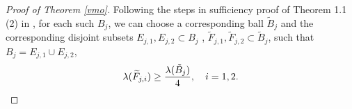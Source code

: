 \documentclass[11pt,a4paper]{amsart}
\numberwithin{equation}{section}
\begin{document}
{\begin{proof}[Proof of   Theorem \ref{vmo}]
Following the steps in sufficiency proof of Theorem 1.1 (2) in \cite{DLLWW}, for each such $B_j$, we can choose a corresponding ball  $\tilde B_j$  and the corresponding disjoint subsets $E_{j,1}, E_{j,2}\subset B_j$ , $\widetilde F_{j,1}, \widetilde F_{j,2}\subset\tilde B_j$, such that $B_j=E_{j,1}\cup E_{j,2}$,
\begin{align}\label{Fj1}
\lambda(\widetilde F_{j,i}) \geq{\lambda(\tilde B_j)\over 4},\quad i=1,2.
\end{align}

\end{proof}}
\end{document}
